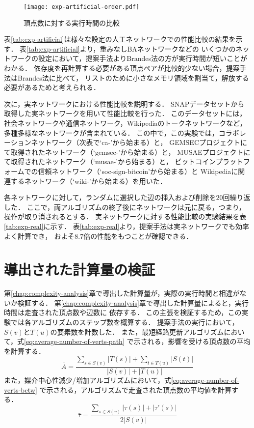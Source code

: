 \begin{figure}[tb]
  \centering
  \texttt{[image: exp-artificial-order.pdf]}
  \caption{頂点数に対する実行時間の比較}
  \label{fig:exp-artificial-order}
\end{figure}

表\ref{tab:exp-artificial}は様々な設定の人工ネットワークでの性能比較の結果を示す．
表\ref{tab:exp-artificial}より，重みなしBAネットワークなどの
いくつかのネットワークの設定において，提案手法よりBrandes法の方が実行時間が短いことがわかる．
依存度を再計算する必要がある頂点ペアが比較的少ない場合，提案手法はBrandes法に比べて，
リストのために小さなメモリ領域を割当て，解放する必要があるためと考えられる．



次に，実ネットワークにおける性能比較を説明する．
SNAPデータセット\cite{Leskovec2016}から取得した実ネットワークを用いて性能比較を行った．
このデータセットには，社会ネットワークや通信ネットワーク，Wikipediaのトークネットワークなど，
多種多様なネットワークが含まれている．
この中で，この実験では，コラボレーションネットワーク（次表で`ca-'から始まる）と，
GEMSECプロジェクト\cite{Rozemberczki2019a}にて取得されたネットワーク（`gemsec-'から始まる）と，
MUSAEプロジェクト\cite{Rozemberczki2019b}にて取得されたネットワーク（`musae-'から始まる）と，
ビットコインプラットフォームでの信頼ネットワーク（`soc-sign-bitcoin'から始まる）と
Wikipediaに関連するネットワーク（`wiki-'から始まる）を用いた．

各ネットワークに対して，ランダムに選択した辺の挿入および削除を$20$回繰り返した．
ここで，両アルゴリズムの終了後にネットワークは元に戻る，つまり，操作が取り消されるとする．
実ネットワークに対する性能比較の実験結果を表\ref{tab:exp-real}に示す．
表\ref{tab:exp-real}より，提案手法は実ネットワークでも効率よく計算でき，
およそ$8.7$倍の性能をもつことが確認できる．



\section{導出された計算量の検証}

第\ref{chap:complexity-analysis}章で導出した計算量が，実際の実行時間と相違がないか検証する．
第\ref{chap:complexity-analysis}章で導出した計算量によると，実行時間は走査された頂点数や辺数に
依存する．
この主張を検証するため，この実験では各アルゴリズムのステップ数を概算する．
提案手法の実行において，$S(v)$と$T(u)$の要素数を計数した．
また，最短経路更新アルゴリズムにおいて，式\eqref{eq:average-number-of-verts-path}
で示される，影響を受ける頂点数の平均を計算する．
\begin{equation}
  \bar{A}=\frac{\sum_{s\in S(v)}|T(s)|+\sum_{t\in T(u)}|S(t)|}{|S(v)|+|T(u)|}
  \label{eq:average-number-of-verts-path}
\end{equation}
また，媒介中心性減少/増加アルゴリズムにおいて，式\eqref{eq:average-number-of-verts-betw}
で示される，アルゴリズムで走査された頂点数の平均値を計算する．
\begin{equation}
  \bar{\tau}=\frac{\sum_{s\in S(v)}|\tau(s)|+|\tau’(s)|}{2|S(v)|}
  \label{eq:average-number-of-verts-betw}
\end{equation}


